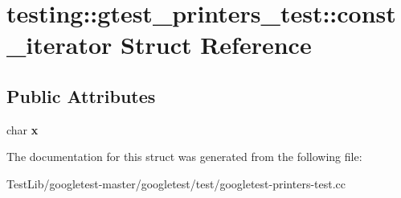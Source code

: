 \hypertarget{structtesting_1_1gtest__printers__test_1_1const__iterator}{}\section{testing\+:\+:gtest\+\_\+printers\+\_\+test\+:\+:const\+\_\+iterator Struct Reference}
\label{structtesting_1_1gtest__printers__test_1_1const__iterator}
\subsection*{Public Attributes}
\begin{DoxyCompactItemize}
\item 
\mbox{\label{structtesting_1_1gtest__printers__test_1_1const__iterator_a4412dbc1c37c2bc5211971f0c8176d6b}} 
char {\bfseries x}
\end{DoxyCompactItemize}


The documentation for this struct was generated from the following file\+:\begin{DoxyCompactItemize}
\item 
Test\+Lib/googletest-\/master/googletest/test/googletest-\/printers-\/test.\+cc\end{DoxyCompactItemize}
